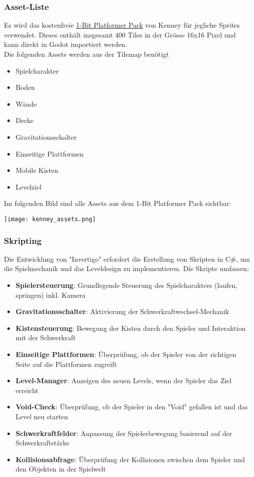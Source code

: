 \documentclass{article}
\begin{document}
\subsubsection{Asset-Liste}
Es wird das kostenfreie \href{https://kenney.nl/assets/1-bit-platformer-pack}{1-Bit Platformer Pack} von Kenney für jegliche Sprites verwendet.
Dieses enthält insgesamt 400 Tiles in der Grösse 16x16 Pixel und kann direkt in Godot importiert werden.
\\
Die folgenden Assets werden aus der Tilemap benötigt
\begin{itemize}
    \item Spielcharakter
    \item Boden
    \item Wände
    \item Decke
    \item Gravitationsschalter
    \item Einseitige Plattformen
    \item Mobile Kisten
    \item Levelziel
\end{itemize}

Im folgenden Bild sind alle Assets aus dem 1-Bit Platformer Pack sichtbar:

\texttt{[image: kenney\_assets.png]}

\subsubsection{Skripting}
Die Entwicklung von "Invertigo" erfordert die Erstellung von Skripten in C\#, um die Spielmechanik und das Leveldesign zu implementieren.
Die Skripte umfassen:
\begin{itemize}
    \item \textbf{Spielersteuerung}: Grundlegende Steuerung des Spielcharakters (laufen, springen) inkl. Kamera
    \item \textbf{Gravitationsschalter}: Aktivierung der Schwerkraftwechsel-Mechanik
    \item \textbf{Kistensteuerung}: Bewegung der Kisten durch den Spieler und Interaktion mit der Schwerkraft
    \item \textbf{Einseitige Plattformen}: Überprüfung, ob der Spieler von der richtigen Seite auf die Plattformen zugreift
    \item \textbf{Level-Manager}: Anzeigen des neuen Levels, wenn der Spieler das Ziel erreicht
    \item \textbf{Void-Check}: Überprüfung, ob der Spieler in den "Void" gefallen ist und das Level neu starten
    \item \textbf{Schwerkraftfelder}: Anpassung der Spielerbewegung basierend auf der Schwerkraftstärke
    \item \textbf{Kollisionsabfrage}: Überprüfung der Kollisionen zwischen dem Spieler und den Objekten in der Spielwelt
\end{itemize}
\end{document}

